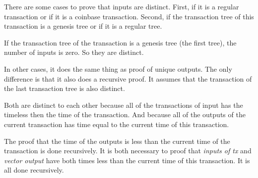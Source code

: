 
There are some cases to prove that inputs are distinct.
First, if it is a regular transaction or if it is a coinbase transaction.
Second, if the transaction tree of this transaction is a genesis tree or if it is a regular tree.

If the transaction tree of the transaction is a genesis tree (the first tree),
the number of inputs is zero.
So they are distinct.

In other cases, it does the same thing as proof of unique outputs.
The only difference is that it also does a recursive proof.
It assumes that the transaction of the last transaction tree is also distinct.


Both are distinct to each other because all of the transactions of input has the timeless
then the time of the transaction.
And because all of the outputs of the current transaction has time equal to the current time
of this transaction.


The proof that the time of the outputs is less than the current time of the transaction
is done recursively.
It is both necessary to proof that \emph{inputs of tx} and \emph{vector output} have both
times less than the current time of this transaction.
It is all done recursively.
